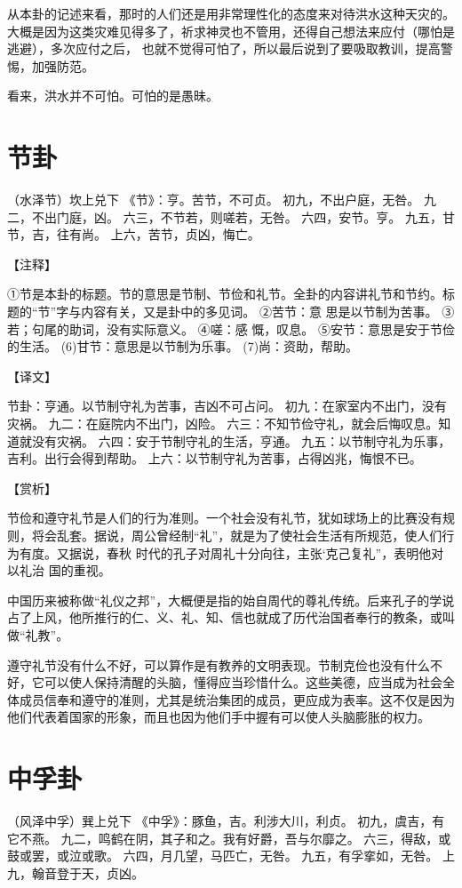 \documentclass[a4paper,12pt,UTF8,twoside]{ctexbook}
\begin{document}
从本卦的记述来看，那时的人们还是用非常理性化的态度来对待洪水这种天灾的。大概是因为这类灾难见得多了，祈求神灵也不管用，还得自己想法来应付（哪怕是逃避），多次应付之后， 也就不觉得可怕了，所以最后说到了要吸取教训，提高警惕，加强防范。

看来，洪水并不可怕。可怕的是愚昧。

\chapter{节卦}

（水泽节）坎上兑下
《节》：亨。苦节，不可贞。
初九，不出户庭，无咎。
九二，不出门庭，凶。
六三，不节若，则嗟若，无咎。
六四，安节。亨。
九五，甘节，吉，往有尚。
上六，苦节，贞凶，悔亡。

【注释】

①节是本卦的标题。节的意思是节制、节俭和礼节。全卦的内容讲礼节和节约。标题的“节”字与内容有关，又是卦中的多见词。
②苦节：意 思是以节制为苦事。
③若；句尾的助词，没有实际意义。
④嗟：感 慨，叹息。
⑤安节：意思是安于节俭的生活。
(6)甘节：意思是以节制为乐事。
(7)尚：资助，帮助。

【译文】

节卦：亨通。以节制守礼为苦事，吉凶不可占问。
初九：在家室内不出门，没有灾祸。
九二：在庭院内不出门，凶险。
六三：不知节俭守礼，就会后悔叹息。知道就没有灾祸。
六四：安于节制守礼的生活，亨通。
九五：以节制守礼为乐事，吉利。出行会得到帮助。
上六：以节制守礼为苦事，占得凶兆，悔恨不已。

【赏析】

节俭和遵守礼节是人们的行为准则。一个社会没有礼节，犹如球场上的比赛没有规则，将会乱套。据说，周公曾经制“礼”，就是为了使社会生活有所规范，使人们行为有度。又据说，春秋 时代的孔子对周礼十分向往，主张‘克己复礼”，表明他对以礼治 国的重视。

中国历来被称做“礼仪之邦”，大概便是指的始自周代的尊礼传统。后来孔子的学说占了上风，他所推行的仁、义、礼、知、信也就成了历代治国者奉行的教条，或叫做“礼教”。

遵守礼节没有什么不好，可以算作是有教养的文明表现。节制克俭也没有什么不好，它可以使人保持清醒的头脑，懂得应当珍惜什么。这些美德，应当成为社会全体成员信奉和遵守的准则，尤其是统治集团的成员，更应成为表率。这不仅是因为他们代表着国家的形象，而且也因为他们手中握有可以使人头脑膨胀的权力。

\chapter{中孚卦}

（风泽中孚）巽上兑下
《中孚》：豚鱼，吉。利涉大川，利贞。
初九，虞吉，有它不燕。
九二，鸣鹤在阴，其子和之。我有好爵，吾与尔靡之。
六三，得敌，或鼓或罢，或泣或歌。
六四，月几望，马匹亡，无咎。
九五，有孚挛如，无咎。
上九，翰音登于天，贞凶。
\end{document}

